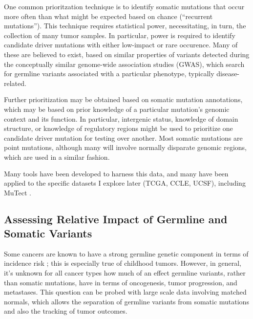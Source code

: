         One common prioritzation technique is to identify somatic
        mutations that occur more often than what might be expected
        based on chance (``recurrent mutations''). This technique
        requires statistical power, necessitating, in turn, the
        collection of many tumor
        samples\cite{leiserson_pan-cancer_2015}. In particular, power
        is required to identify candidate driver mutations with either
        low-impact or rare occurence. Many of these are believed to
        exist, based on similar properties of variants detected during
        the conceptually similar genome-wide association studies
        (GWAS), which search for germline variants associated with a
        particular phenotype, typically disease-related. 
        
        Further prioritization may be obtained based on somatic
        mutation annotations, which may be based on prior knowledge of
        a particular mutation's genomic context and its function. In particular,
        intergenic status, knowledge of domain structure, or knowledge
        of regulatory regions might be used to prioritize one
        candidate driver mutation for testing over another. Most
        somatic mutations are point mutations, although 
        many will involve normally disparate genomic regions, which
        are used in a similar fashion.

        Many tools have been developed to harness this data, and many
        have been applied to the specific datasets I explore later
        (TCGA, CCLE, UCSF), including MuTect
        \cite{cibulskis_sensitive_2013}.


        \subsection{Assessing Relative Impact of Germline and Somatic Variants}

        Some cancers are known to have a strong germline genetic component in
        terms of incidence risk ; this is especially true of
        childhood tumors. However, in general, it's unknown for all
        cancer types how much of an effect germline variants, rather
        than somatic mutations, have in terms of oncogenesis,
        tumor progression, and metastases. This question can be probed
        with large scale data        
        involving matched normals, which allows the separation of
        germline variants from somatic mutations and also the tracking
        of tumor outcomes.

